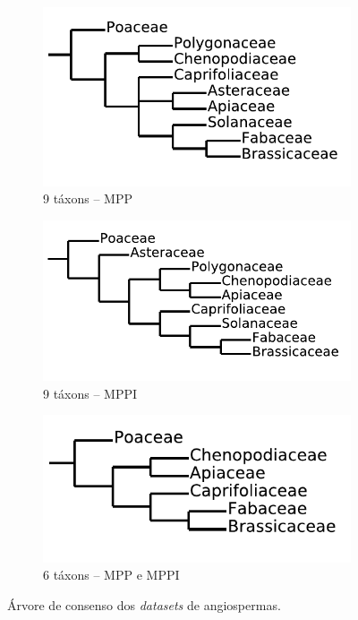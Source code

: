 \documentclass[12pt]{article}
\begin{document}
\begin{figure}[ht]
  \centering
  \begin{subfigure}{.4\textwidth}
    \includegraphics[width=\textwidth]{img/angiosperms-smp_svg-tex.pdf}
    \caption{9 táxons -- MPP}
    \label{fig:angiosperms-smp}
  \end{subfigure}
  \begin{subfigure}{.4\textwidth}
    \includegraphics[width=\textwidth]{img/angiosperms-iwmp_svg-tex.pdf}
    \caption{9 táxons -- MPPI}
    \label{fig:angiosperms-iwmp}
  \end{subfigure}
  \begin{subfigure}{.4\textwidth}
    \includegraphics[width=\textwidth]{img/angiosperms2_svg-tex.pdf}
    \caption{6 táxons -- MPP e MPPI}
    \label{fig:angiosperms2}
  \end{subfigure}
  \caption{Árvore de consenso dos \emph{datasets} de angiospermas.}
  \label{fig:angiosperms}
\end{figure}
\end{document}
